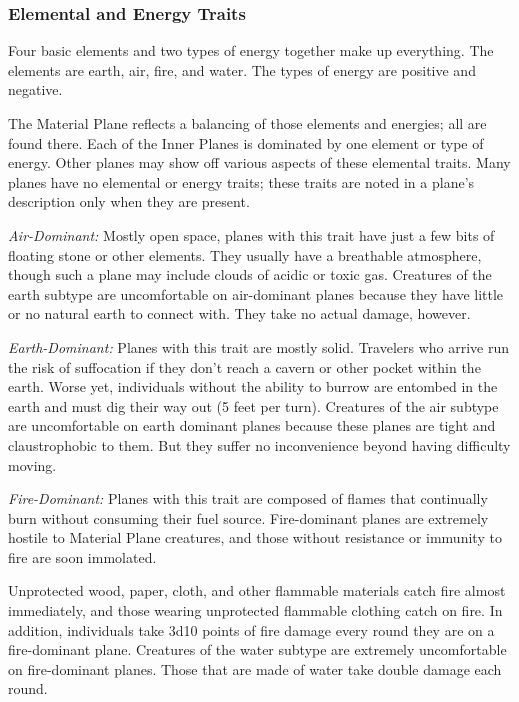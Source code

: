 \subsubsection{Elemental and Energy Traits}

Four basic elements and two types of energy together make up everything. The elements 
are earth, air, fire, and water. The types of energy are positive and negative.

The Material Plane reflects a balancing of those elements and energies; all are 
found there. Each of the Inner Planes is dominated by one element or type of energy. 
Other planes may show off various aspects of these elemental traits. Many planes 
have no elemental or energy traits; these traits are noted in a plane's description 
only when they are present.

\textit{Air-Dominant:} Mostly open space, planes with this trait have just a few 
bits of floating stone or other elements. They usually have a breathable atmosphere, 
though such a plane may include clouds of acidic or toxic gas. Creatures of the 
earth subtype are uncomfortable on air-dominant planes because they have little 
or no natural earth to connect with. They take no actual damage, however.

\textit{Earth-Dominant:} Planes with this trait are mostly solid. Travelers who 
arrive run the risk of suffocation if they don't reach a cavern or other pocket 
within the earth. Worse yet, individuals without the ability to burrow are entombed 
in the earth and must dig their way out (5 feet per turn). Creatures of the air 
subtype are uncomfortable on earth dominant planes because these planes are tight 
and claustrophobic to them. But they suffer no inconvenience beyond having difficulty 
moving.

\textit{Fire-Dominant:} Planes with this trait are composed of flames that continually 
burn without consuming their fuel source. Fire-dominant planes are extremely hostile 
to Material Plane creatures, and those without resistance or immunity to fire are 
soon immolated.

Unprotected wood, paper, cloth, and other flammable materials catch fire almost 
immediately, and those wearing unprotected flammable clothing catch on fire. In 
addition, individuals take 3d10 points of fire damage every round they are on a 
fire-dominant plane. Creatures of the water subtype are extremely uncomfortable 
on fire-dominant planes. Those that are made of water take double damage each round.

